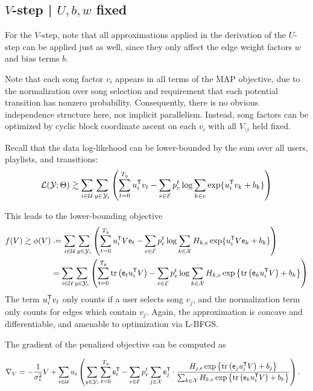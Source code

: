 \documentclass{article}
\def\e{\ensuremath{\mathsf{e}}}
\def\E{\ensuremath{\mathcal{E}}}
\def\U{\ensuremath{\mathcal{U}}}
\begin{document}
\subsection{$V$-step | $U, b, w$ fixed}
For the $V$-step, note that all approximations applied in the derivation of the $U$-step can be applied just as well, since they only affect the edge weight factors $w$ and bias terms
$b$.

Note that each song factor $v_i$ appears in all terms of the MAP objective, due to the normalization over song selection and requirement that each potential transition has nonzero 
probability.  Consequently, there is no obvious independence structure here, nor implicit parallelism.  
Instead, song factors can be optimized by cyclic block coordinate ascent on each $v_i$ with all $V_{\setminus i}$ held fixed.

Recall that the data log-likehood can be lower-bounded by the sum over all users, playlists, and transitions:
\[
\Ell(\Y; \Theta) \gtrsim \sum_{i \in \U} \sum_{y \in \Y_i} \left(\sum_{t=0}^{T_y} u_i\trans v_t - \sum_{e \in \E} p_e^t \log \sum_{k\in e} \exp\{u_i\trans v_k + b_k\} \right)
\]

This leads to the lower-bounding objective 
\begin{align*}
f(V) \gtrsim \phi(V) &\defeq \sum_{i \in \U} \sum_{y \in \Y_i} \left(\sum_{t=0}^{T_y} u_i\trans V \e_t - \sum_{e \in \E} p_e^t \log \sum_{k\in \X} H_{k,e} \exp\{u_i\trans V \e_k + b_k\}
\right)\\
&= \sum_{i \in \U} \sum_{y \in \Y_i} \left(\sum_{t=0}^{T_y} \trace\left(\e_t u_i\trans V\right)- \sum_{e \in \E} p_e^t \log \sum_{k\in \X} H_{k,e} \exp\left\{\trace\left(\e_k u_i\trans
V\right) + b_k\right\} \right)
\end{align*}
The term $u_i^\mathsf{T} v_t$ only counts if a user selects song $v_j$, and the normalization term only counts for edges which contain $v_j$.  Again, the approximation is concave and
differentiable, and amenable to optimization via L-BFGS.

The gradient of the penalized objective can be computed as 

\begin{align}
\nabla_{V} &= -\frac{1}{\sigma_v^2} V + \sum_{i \in \U} u_i \left(\sum_{y \in \Y_i}
\sum_{t=0}^{T_y} \e_t\trans
- \sum_{e \in \E} p_e^t \sum_{j \in \X} \e_j\trans \cdot \frac{H_{j,e} \exp\left\{\trace\left( \e_j u_i\trans V\right) + b_j\right\}}{\sum_{k\in\X} H_{k,e}
  \exp\left\{\trace\left(\e_k u_i\trans V\right) + b_k\right\}}
\right).
\end{align}
\end{document}

